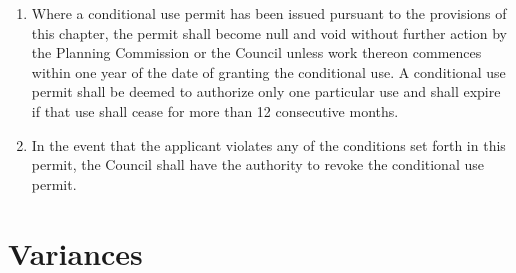 \begin{enumerate}[{\indent}1)]
    \item Where a conditional use permit has been issued pursuant to the provisions of this chapter, the permit shall become null and void without further action by the Planning Commission or the Council unless work thereon commences within one year of the date of granting the conditional use. A conditional use permit shall be deemed to authorize only one particular use and shall expire if that use shall cease for more than 12 consecutive months.
    \item In the event that the applicant violates any of the conditions set forth in this permit, the Council shall have the authority to revoke the conditional use permit.
\end{enumerate}

\section{Variances}
